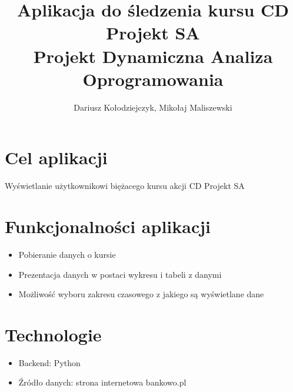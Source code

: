 \documentclass{article}
\begin{document}
		\title{Aplikacja do śledzenia kursu CD Projekt SA \\ Projekt Dynamiczna Analiza Oprogramowania}
	\author{Dariusz Kołodziejczyk, Mikołaj Maliszewski}
	\maketitle
	\section{Cel aplikacji}
	Wyświetlanie użytkownikowi biężacego kursu akcji CD Projekt SA 
	\section{Funkcjonalności aplikacji}
	\begin{itemize}
		\item Pobieranie danych o kursie 
		\item Prezentacja danych w postaci wykresu i tabeli z danymi
		\item Możliwość wyboru zakresu czasowego z jakiego są wyświetlane dane
	\end{itemize}
	\section{Technologie}
	\begin{itemize}
		\item 	Backend: Python
		\item Źródło danych: strona internetowa bankowo.pl 
	\end{itemize}
	
\end{document}
